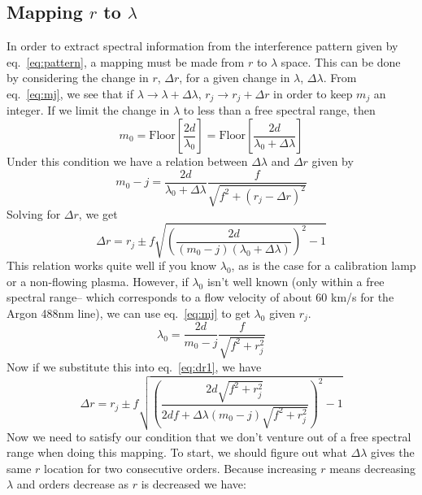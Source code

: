 \documentclass{article}
\begin{document}
\subsection{Mapping $r$ to $\lambda$}
In order to extract spectral information from the interference pattern given by eq.~\ref{eq:pattern}, a mapping must be made from $r$ to $\lambda$ space. This can be done by considering the change in $r$, $\Delta r$, for a given change in $\lambda$, $\Delta\lambda$. From eq.~\ref{eq:mj}, we see that if $\lambda\rightarrow\lambda+\Delta\lambda$, $r_{j}\rightarrow r_{j}+\Delta r$ in order to keep $m_{j}$ an integer. If we limit the change in $\lambda$ to less than a free spectral range, then
\begin{equation}
m_{0}=\text{Floor}\left[\frac{2d}{\lambda_{0}}\right]=\text{Floor}\left[\frac{2d}{\lambda_{0}+\Delta\lambda}\right]
\end{equation}
Under this condition we have a relation between $\Delta\lambda$ and $\Delta r$ given by
\begin{equation}
m_{0}-j = \frac{2d}{\lambda_{0}+\Delta\lambda}\frac{f}{\sqrt{f^{2}+(r_{j}-\Delta r)^{2}}}
\end{equation}
Solving for $\Delta r$, we get
\begin{equation}
\Delta r = r_{j} \pm f \sqrt{\left(\frac{2d}{(m_{0}-j)(\lambda_{0}+\Delta\lambda)}\right)^{2}-1}
\label{eq:dr1}
\end{equation}
This relation works quite well if you know $\lambda_{0}$, as is the case for a calibration lamp or a non-flowing plasma. However, if $\lambda_{0}$ isn't well known (only within a free spectral range-- which corresponds to a flow velocity of about 60 km/s for the Argon 488nm line), we can use eq.~\ref{eq:mj} to get $\lambda_{0}$ given $r_{j}$.
\begin{equation}
\lambda_{0}=\frac{2d}{m_{0}-j}\frac{f}{\sqrt{f^{2}+r_{j}^{2}}}
\label{eq:lam_sub}
\end{equation}
Now if we substitute this into eq.~\ref{eq:dr1}, we have
\begin{equation}
\Delta r = r_{j} \pm f\sqrt{\left(\frac{2d\sqrt{f^{2}+r_{j}^{2}}}{2df+\Delta\lambda(m_{0}-j)\sqrt{f^{2}+r_{j}^{2}}}\right)^{2}-1}
\label{eq:dr2}
\end{equation}
Now we need to satisfy our condition that we don't venture out of a free spectral range when doing this mapping. To start, we should figure out what $\Delta\lambda$ gives the same $r$ location for two consecutive orders. Because increasing $r$ means decreasing $\lambda$ and orders decrease as $r$ is decreased we have:
\end{document}
